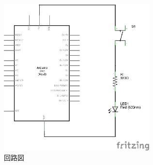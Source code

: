 \documentclass[11pt,a4paper]{jarticle}
\begin{document}



\begin{figure}[h!]
 \centering
 \includegraphics[height=80mm]{img/circuit01.eps}
 \caption{回路図}
\end{figure}
\end{document}
